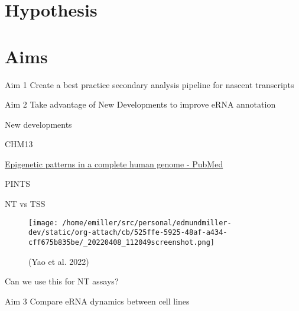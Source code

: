 \documentclass[presentation]{beamer}
\begin{document}
\section*{Hypothesis}
\label{sec:org9f34125}
\section*{Aims}
\label{sec:org5bba25c}
\begin{frame}[label={sec:org1c1b472}]{Aim 1 Create a best practice secondary analysis pipeline for nascent transcripts}
\end{frame}
\begin{frame}[label={sec:org36a2a0a}]{Aim 2 Take advantage of New Developments to improve eRNA annotation}
\begin{block}{New developments}
\end{block}
\begin{block}{CHM13}
\begin{block}{\href{https://pubmed.ncbi.nlm.nih.gov/35357915/}{Epigenetic patterns in a complete human genome - PubMed}}
\end{block}
\end{block}
\begin{block}{PINTS}
\begin{block}{NT vs TSS}
\begin{figure}[htbp]
\centering
\texttt{[image: /home/emiller/src/personal/edmundmiller-dev/static/org-attach/cb/525ffe-5925-48af-a434-cff675b835be/\_20220408\_112049screenshot.png]}
\caption{(Yao et al. 2022)}
\end{figure}
\end{block}


\begin{block}{Can we use this for NT assays?}
\end{block}
\end{block}
\end{frame}
\begin{frame}[label={sec:org54035df}]{Aim 3 Compare eRNA dynamics between cell lines}
\end{frame}
\end{document}
